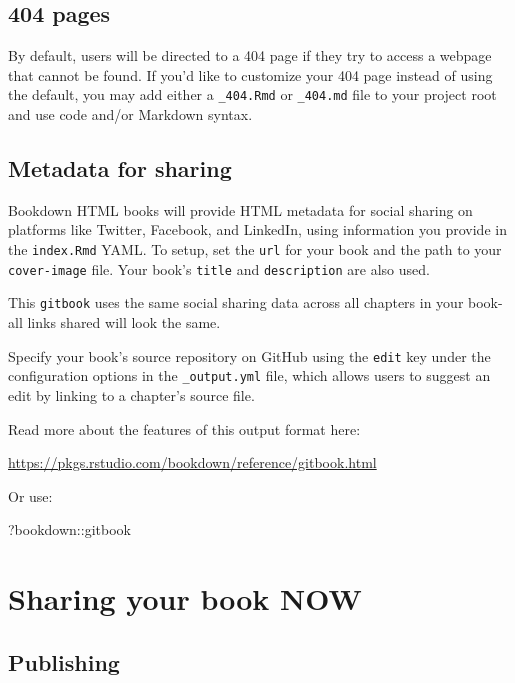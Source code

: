 \documentclass[
]{book}
\newenvironment{Shaded}{\begin{snugshade}}{\end{snugshade}}
\newcommand{\NormalTok}[1]{#1}
\newcommand{\SpecialCharTok}[1]{\textcolor[rgb]{0.00,0.00,0.00}{#1}}
\theoremstyle{definition}
\theoremstyle{definition}
\theoremstyle{definition}
\theoremstyle{definition}
\theoremstyle{remark}
\begin{document}
\hypertarget{pages-2}{%
\section{404 pages}\label{pages-2}}

By default, users will be directed to a 404 page if they try to access a webpage that cannot be found. If you'd like to customize your 404 page instead of using the default, you may add either a \texttt{\_404.Rmd} or \texttt{\_404.md} file to your project root and use code and/or Markdown syntax.

\hypertarget{metadata-for-sharing-2}{%
\section{Metadata for sharing}\label{metadata-for-sharing-2}}

Bookdown HTML books will provide HTML metadata for social sharing on platforms like Twitter, Facebook, and LinkedIn, using information you provide in the \texttt{index.Rmd} YAML. To setup, set the \texttt{url} for your book and the path to your \texttt{cover-image} file. Your book's \texttt{title} and \texttt{description} are also used.

This \texttt{gitbook} uses the same social sharing data across all chapters in your book- all links shared will look the same.

Specify your book's source repository on GitHub using the \texttt{edit} key under the configuration options in the \texttt{\_output.yml} file, which allows users to suggest an edit by linking to a chapter's source file.

Read more about the features of this output format here:

\url{https://pkgs.rstudio.com/bookdown/reference/gitbook.html}

Or use:

\begin{Shaded}
\begin{Highlighting}[]
\NormalTok{?bookdown}\SpecialCharTok{::}\NormalTok{gitbook}
\end{Highlighting}
\end{Shaded}

\hypertarget{sharing-your-book-now}{%
\chapter{Sharing your book NOW}\label{sharing-your-book-now}}

\hypertarget{publishing-3}{%
\section{Publishing}\label{publishing-3}}
\end{document}

